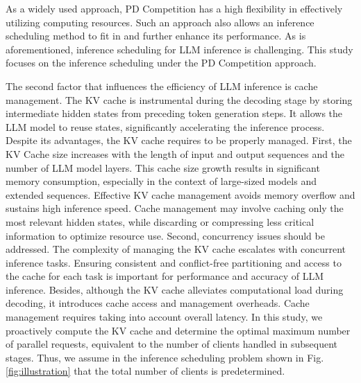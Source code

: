 As a widely used approach, PD Competition has a high flexibility in effectively utilizing computing resources. Such an approach also allows an inference scheduling method to fit in and further enhance its performance. As is aforementioned, inference scheduling for LLM inference is challenging. This study focuses on the inference scheduling under the PD Competition approach.

The second factor that influences the efficiency of LLM inference is cache management. The KV cache is instrumental during the decoding stage by storing intermediate hidden states from preceding token generation steps. It allows the LLM model to reuse states, significantly accelerating the inference process. Despite its advantages, the KV cache requires to be properly managed. First, the KV Cache size increases with the length of input and output sequences and the number of LLM model layers. This cache size growth results in significant memory consumption, especially in the context of large-sized models and extended sequences. Effective KV cache management avoids memory overflow and sustains high inference speed. Cache management may involve caching only the most relevant hidden states, while discarding or compressing less critical information to optimize resource use. Second, concurrency issues should be addressed. The complexity of managing the KV cache escalates with concurrent inference tasks. Ensuring consistent and conflict-free partitioning and access to the cache for each task is important for performance and accuracy of LLM inference. Besides, although the KV cache alleviates computational load during decoding, it introduces cache access and management overheads. Cache management requires taking into account overall latency. In this study, we proactively compute the KV cache and determine the optimal maximum number of parallel requests, equivalent to the number of clients handled in subsequent stages. Thus, we assume in the inference scheduling problem shown in Fig. \ref{fig:illustration} that the total number of clients is predetermined.

